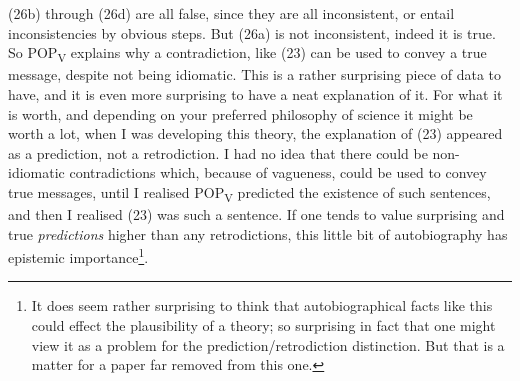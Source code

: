 \noindent (26b) through (26d) are all false, since they are all inconsistent, or entail inconsistencies by obvious steps. But (26a) is not inconsistent, indeed it is true. So POP\textsubscript{V} explains why a contradiction, like (23) can be used to convey a true message, despite not being idiomatic. This is a rather surprising piece of data to have, and it is even more surprising to have a neat explanation of it. For what it is worth, and depending on your preferred philosophy of science it might be worth a lot, when I was developing this theory, the explanation of (23) appeared as a prediction, not a retrodiction. I had no idea that there could be non-idiomatic contradictions which, because of vagueness, could be used to convey true messages, until I realised POP\textsubscript{V} predicted the existence of such sentences, and then I realised (23) was such a sentence. If one tends to value surprising and true \textit{predictions} higher than any retrodictions, this little bit of autobiography has epistemic importance\footnote{It does seem rather surprising to think that autobiographical facts like this could effect the plausibility of a theory; so surprising in fact that one might view it as a problem for the prediction/retrodiction distinction. But that is a matter for a paper far removed from this one.}.

